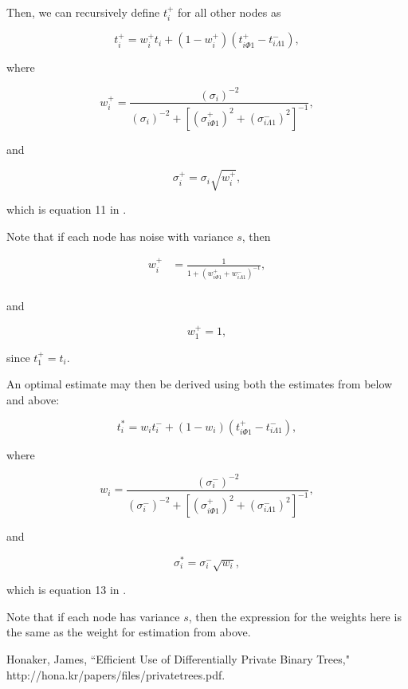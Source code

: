 \documentclass[11pt, oneside]{article}
\begin{document}
Then, we can recursively define $t_i^+$ for all other nodes as  

$$ t_i^+ = w_i^+ t_i + (1-w_i^+) (t_{i\Phi1}^+ - t_{i \Lambda 1}^-),$$

where 

$$ w_i^+ = \frac{(\sigma_i)^{-2}}{(\sigma_i)^{-2} + \left[(\sigma^+_{i\Phi 1})^2 + (\sigma^-_{i \Lambda 1})^2\right]^{-1}},$$

and 

$$ \sigma^+_i = \sigma_i \sqrt{w_i^+},$$

which is equation 11 in \cite{honaker}.

Note that if each node has noise with variance $s$, then 

\begin{align*}
w_i^+ &= \frac{1}{1 + (w_{i \Phi 1}^+ + w_{i \Lambda 1}^-)^{-1}}, \\
\end{align*}

and

$$w_1^+ = 1,$$

since $t_1^+ = t_i$.

An optimal estimate may then be derived using both the estimates from below and above: 

$$ t_i^* = w_i t_i^- + (1-w_i) (t_{i \Phi 1} ^+ - t_{i \Lambda 1}^-),$$

where

$$ w_i = \frac{(\sigma_i^-)^{-2}}{(\sigma_i^-)^{-2} + \left[(\sigma_{i\Phi 1}^+)^2 + (\sigma_{i \Lambda 1}^-)^2\right]^{-1}}, $$

and 

$$ \sigma_i^* = \sigma_i^-\sqrt{w_i},$$

which is equation 13 in \cite{honaker}.

Note that if each node has variance $s$, then the expression for the weights here is the same as the weight for estimation from above.

\begin{thebibliography}{2}
	  Honaker, James, ``Efficient Use of Differentially Private Binary Trees," http://hona.kr/papers/files/privatetrees.pdf.
\end{thebibliography}
\end{document}
